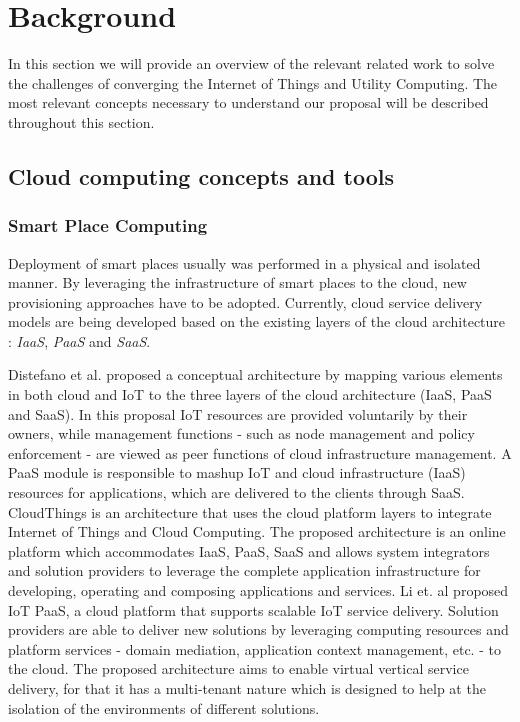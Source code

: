 
\section{Background}
\label{sec:background}
In this section we will provide an overview of the relevant related work to solve the challenges of
converging the Internet of Things and Utility Computing. The most relevant concepts necessary to
understand our proposal will be described throughout this section.

\subsection{Cloud computing concepts and tools}
\label{sub:cloud_concepts_tools}

\subsubsection{Smart Place Computing}
\label{sub:smart_place_computing}
Deployment of smart places usually was performed in a physical and isolated manner. By leveraging the
infrastructure of smart places to the cloud, new provisioning approaches have to be adopted. Currently,
cloud service delivery models are being developed based on the existing layers of the cloud
architecture \cite{zhang2010cloud}: \textit{IaaS}, \textit{PaaS} and \textit{SaaS}.

Distefano et al. \cite{distefano2012enabling} proposed a conceptual architecture by
mapping various elements in both cloud and IoT to the three layers of the cloud architecture (\gls{IaaS},
\gls{PaaS} and \gls{SaaS}). In this proposal IoT resources are provided voluntarily by their owners,
while management functions - such as node management and policy enforcement - are viewed as peer
functions of cloud infrastructure management. A \gls{PaaS} module is responsible to mashup IoT and
cloud infrastructure (\gls{IaaS}) resources for applications, which are delivered to the clients
through \gls{SaaS}.
CloudThings \cite{zhou2013cloudthings} is an architecture that uses the cloud platform layers to
integrate Internet of Things and Cloud Computing. The proposed architecture is an online platform
which accommodates \gls{IaaS}, \gls{PaaS}, \gls{SaaS} and allows system integrators and solution
providers to leverage the complete application infrastructure for developing, operating and composing
applications and services.
Li et. al \cite{li2013efficient} proposed IoT PaaS, a cloud platform that supports
scalable IoT service delivery. Solution providers are able to deliver new solutions by leveraging
computing resources and platform services - domain mediation, application context management, etc.
- to the cloud. The proposed architecture aims to enable virtual vertical service delivery, for that
it has a multi-tenant nature which is designed to help at the isolation of the environments of
different solutions.

